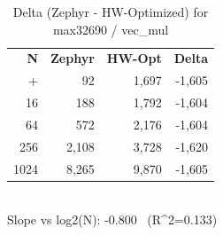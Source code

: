 \begin{table}[tb]
    \centering
    \caption{Delta (Zephyr - HW-Optimized) for max32690 / vec_mul}
    \label{tab:delta_max32690_vec_mul}
    \scriptsize
    \begin{tabular}{r r r r}
        \hline
        \textbf{N} & \textbf{Zephyr} & \textbf{HW-Opt} & \textbf{Delta} \\\n+        \hline
        4 & 92 & 1,697 & -1,605\\
        16 & 188 & 1,792 & -1,604\\
        64 & 572 & 2,176 & -1,604\\
        256 & 2,108 & 3,728 & -1,620\\
        1024 & 8,265 & 9,870 & -1,605\\
        \hline
    \end{tabular}
    \vspace{2mm}\\\n    Slope vs log2(N): -0.800 \ (R^2=0.133)\n\end{table}
